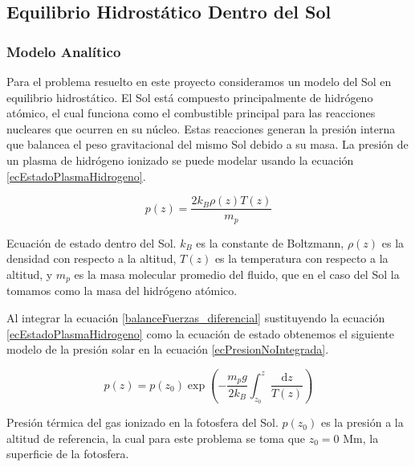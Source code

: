 \subsection{Equilibrio Hidrostático Dentro del Sol}

\subsubsection{Modelo Analítico} \label{sec:modeloAnalitico}

Para el problema resuelto en este proyecto consideramos un modelo del Sol en
equilibrio hidrostático. El Sol está compuesto principalmente de hidrógeno
atómico, el cual funciona como el combustible principal para las reacciones
nucleares que ocurren en su núcleo. Estas reacciones generan la presión interna
que balancea el peso gravitacional del mismo Sol debido a su masa. La presión de
un plasma de hidrógeno ionizado se puede modelar usando la ecuación
\ref{ecEstadoPlasmaHidrogeno}. 

\begin{equ}[!ht]
	\begin{equation} \label{ecEstadoPlasmaHidrogeno}
		p(z) = \frac{2 k_B \rho (z) T(z)}{m_p}
	\end{equation}
	\caption{Ecuación de estado dentro del Sol. \(k_B\) es la constante de
	Boltzmann, \(\rho (z)\) es la densidad con respecto a la altitud, \(T(z)\)
	es la temperatura con respecto a la altitud, y \(m_p\) es la masa molecular
	promedio del fluido, que en el caso del Sol la tomamos como la masa del
	hidrógeno atómico. \cite{newtonianCafe}}
\end{equ}

Al integrar la ecuación \ref{balanceFuerzas_diferencial} sustituyendo la
ecuación \ref{ecEstadoPlasmaHidrogeno} como la ecuación de estado obtenemos el
siguiente modelo de la presión solar en la ecuación \ref{ecPresionNoIntegrada}.

\begin{equ}[!ht]
	\begin{equation} \label{ecPresionNoIntegrada}
		p(z) = p(z_0) \exp \left(- \frac{m_p g}{2 k_B} \int_{z_0}^{z} \frac{\mathrm{d} z}{T(z)}\right)
	\end{equation}
	\caption{Presión térmica del gas ionizado en la fotosfera del Sol.
	\(p(z_0)\) es la presión a la altitud de referencia, la cual para este
	problema se toma que \(z_0 = 0 \textrm{ Mm}\), la superficie de la
	fotosfera.}
\end{equ}

